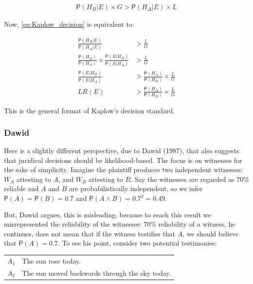 \documentclass[10pt,dvipsnames,enabledeprecatedfontcommands]{scrartcl}
\newcommand{\et}{\wedge}
\newcommand{\pr}[1]{\mathsf{P}(#1)}
\begin{document}
\vspace{-6mm}

\begin{align}
\label{eq:Kaplow_decision}
\pr{H_\Pi\vert E}\times G > \pr{H_\Delta\vert E}\times L
\end{align}

\noindent Now, \eqref{eq:Kaplow_decision} is equivalent to:

\vspace{-6mm}

\begin{align}
\nonumber
\frac{\pr{H_\Pi \vert E}}{\pr{H_\Delta \vert E}} & > \frac{L}{G}\\
\nonumber
\frac{\pr{H_\Pi}}{\pr{H_\Delta}} \times \frac{\pr{E\vert H_\Pi}}{\pr{E\vert H_\Delta}} &> \frac{L}{G}\\
\nonumber
\frac{\pr{E\vert H_\Pi}}{\pr{E\vert H_\Delta}}  & > \frac{\pr{H_\Delta}}{\pr{H_\Pi}} \times \frac{L}{G}\\
\label{eq:Kaplow_decision2} LR(E)  & > \frac{\pr{H_\Delta}}{\pr{H_\Pi}} \times \frac{L}{G}
\end{align}

\noindent This is the general format of Kaplow's decision standard.

\subsubsection{Dawid}\label{dawid}

Here is a slightly different perspective, due to Dawid (1987), that also
suggests that juridical decisions should be likelihood-based. The focus
is on witnesses for the sake of simplicity. Imagine the plaintiff
produces two independent witnesses: \(W_A\) attesting to \(A\), and
\(W_B\) attesting to \(B\). Say the witnesses are regarded as \(70\%\)
reliable and \(A\) and \(B\) are probabilistically independent, so we
infer \(\pr{A}=\pr{B}=0.7\) and \(\pr{A\et B}=0.7^2=0.49\).

But, Dawid argues, this is misleading, because to reach this result we
misrepresented the reliability of the witnesses: \(70\%\) reliability of
a witness, he continues, does not mean that if the witness testifies
that \(A\), we should believe that \(\pr{A}=0.7\). To see his point,
consider two potential testimonies:

\begin{center}
\begin{tabular}
{@{}ll@{}}
\toprule
  $A_1$ & The sun rose today. \\
   $A_2$ & The sun moved backwards through the sky today.\\
\bottomrule
\end{tabular}
\end{center}
\end{document}
